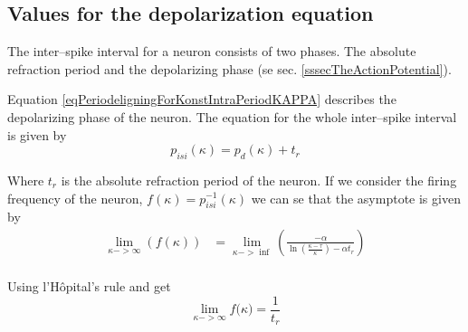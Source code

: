 \subsection{Values for the depolarization equation}
\label{sssecValueOfAlpha}


The inter--spike interval for a neuron consists of two phases. 
The absolute refraction period and the depolarizing phase (se sec. \ref{sssecTheActionPotential}).

Equation \eqref{eqPeriodeligningForKonstIntraPeriodKAPPA} describes the depolarizing phase of the neuron. %
The equation for the whole inter--spike interval is given by
\begin{equation}
	p_{isi}(\kappa) = p_d(\kappa) + t_r
\end{equation}

Where $t_r$ is the absolute refraction period of the neuron. %
If we consider the firing frequency of the neuron, $f(\kappa) = p_{isi}^{-1}(\kappa)$ we can se that the asymptote is given by
\begin{equation}
	\begin{split}
		\lim_{\kappa->\infty}(f(\kappa)) &= \lim_{\kappa->\inf}\left( \frac{-\alpha}{\ln \left( \frac{\kappa - \tau}{\kappa} \right) - \alpha t_r} \right) \\
	\end{split}
\end{equation}

Using l'Hôpital's rule %
and get %
\begin{equation}
	\label{eqFrekvensLlim}
	\lim_{\kappa->\infty}{ f(\kappa}) = \frac{1}{t_r}
\end{equation}



